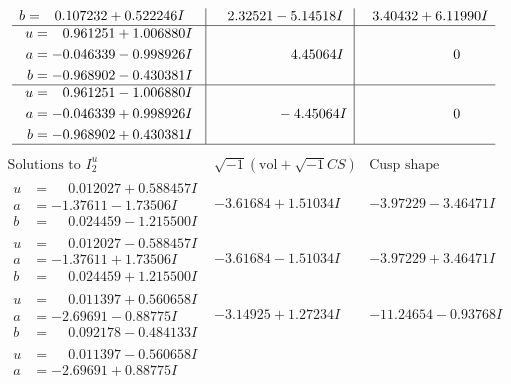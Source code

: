 \documentclass[1p]{elsarticle_modified}
\theoremstyle{definition}
\newcommand{\I}{\sqrt{-1}}
\begin{document}
$$\begin{array}{c|c|c}
\begin{aligned}
b &= \phantom{-}0.107232 + 0.522246 I\end{aligned}
 & \phantom{-}2.32521 - 5.14518 I & \phantom{-}3.40432 + 6.11990 I \\ \hline\begin{aligned}
u &= \phantom{-}0.961251 + 1.006880 I \\
a &= -0.046339 - 0.998926 I \\
b &= -0.968902 - 0.430381 I\end{aligned}
 & \phantom{-0.000000 -}4.45064 I & \phantom{-0.000000 } 0 \\ \hline\begin{aligned}
u &= \phantom{-}0.961251 - 1.006880 I \\
a &= -0.046339 + 0.998926 I \\
b &= -0.968902 + 0.430381 I\end{aligned}
 & \phantom{-0.000000 } -4.45064 I & \phantom{-0.000000 } 0\\
 \hline 
 \end{array}$$\newpage$$\begin{array}{c|c|c}  
\text{Solutions to }I^u_{2}& \I (\text{vol} + \sqrt{-1}CS) & \text{Cusp shape}\\
 \hline 
\begin{aligned}
u &= \phantom{-}0.012027 + 0.588457 I \\
a &= -1.37611 - 1.73506 I \\
b &= \phantom{-}0.024459 - 1.215500 I\end{aligned}
 & -3.61684 + 1.51034 I & -3.97229 - 3.46471 I \\ \hline\begin{aligned}
u &= \phantom{-}0.012027 - 0.588457 I \\
a &= -1.37611 + 1.73506 I \\
b &= \phantom{-}0.024459 + 1.215500 I\end{aligned}
 & -3.61684 - 1.51034 I & -3.97229 + 3.46471 I \\ \hline\begin{aligned}
u &= \phantom{-}0.011397 + 0.560658 I \\
a &= -2.69691 - 0.88775 I \\
b &= \phantom{-}0.092178 - 0.484133 I\end{aligned}
 & -3.14925 + 1.27234 I & -11.24654 - 0.93768 I \\ \hline\begin{aligned}
u &= \phantom{-}0.011397 - 0.560658 I \\
a &= -2.69691 + 0.88775 I \\

\end{aligned}
\end{array}$$
\end{document}
